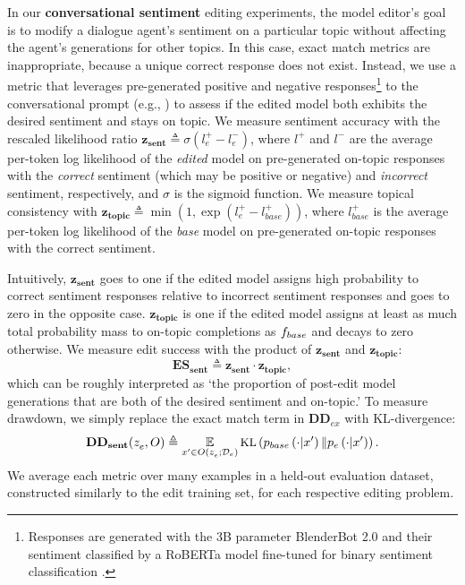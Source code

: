 \documentclass{article}
\begin{document}
In our \textbf{conversational sentiment} editing experiments, the model editor's goal is to modify a dialogue agent's sentiment on a particular topic without affecting the agent's generations for other topics. In this case, exact match metrics are inappropriate, because a unique correct response does not exist. Instead, we use a metric that leverages pre-generated positive and negative responses\footnote{Responses are generated with the 3B parameter BlenderBot 2.0 \citep{roller2021recipes} and their sentiment classified by a RoBERTa model fine-tuned for binary sentiment classification \citep{heitmann2020}.} to the conversational prompt (e.g., ) to assess if the edited model both exhibits the desired sentiment and stays on topic. We measure sentiment accuracy with the rescaled likelihood ratio $\mathbf{z_{sent}} \triangleq \sigma(l_e^+ - l_e^-)$, where $l^+$ and $l^-$ are the average per-token log likelihood of the \textit{edited} model on pre-generated on-topic responses with the \textit{correct} sentiment (which may be positive or negative) and \textit{incorrect} sentiment, respectively, and $\sigma$ is the sigmoid function. We measure topical consistency with $\mathbf{z_{topic}} \triangleq \min\left(1, \exp(l_e^+ - l_{base}^+)\right)$, where $l_{base}^+$ is the average per-token log likelihood of the \textit{base} model on pre-generated on-topic responses with the correct sentiment.

Intuitively, $\mathbf{z_{sent}}$ goes to one if the edited model assigns high probability to correct sentiment responses relative to incorrect sentiment responses and goes to zero in the opposite case. $\mathbf{z_{topic}}$ is one if the edited model assigns at least as much total probability mass to on-topic completions as $f_{base}$ and decays to zero otherwise. We measure edit success with the product of $\mathbf{z_{sent}}$ and $\mathbf{z_{topic}}$:
\begin{equation}
    \mathbf{ES_{sent}} \triangleq \mathbf{z_{sent}} \cdot \mathbf{z_{topic}},
\end{equation}
which can be roughly interpreted as `the proportion of post-edit model generations that are both of the desired sentiment and on-topic.' To measure drawdown, we simply replace the exact match term in $\mathbf{DD}_{ex}$ with KL-divergence:
\begin{equation}
    \small
    \mathbf{DD_{sent}}(z_e^{},O) \triangleq \operatorname*{\mathbb{E}}_{x' \in\\  O(z_e^{}; \mathcal{D}_{e})} \text{KL}\left(p_{base}\left(\cdot|x'\right) \| p_{e}\left(\cdot|x'\right)\right).
\end{equation}
We average each metric over many examples in a held-out evaluation dataset, constructed similarly to the edit training set, for each respective editing problem.
\end{document}
